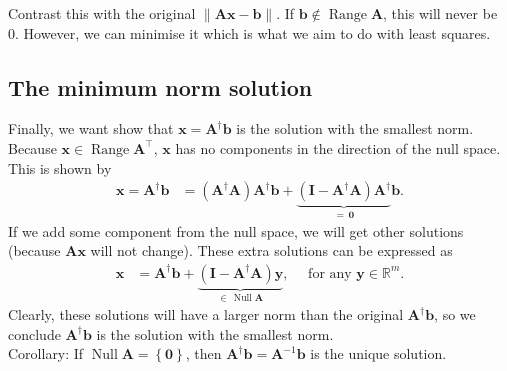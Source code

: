\documentclass[12pt,a4paper]{article} %
\DeclareMathOperator{\Range}{Range}
\DeclareMathOperator{\Null}{Null}
\begin{document}
Contrast this with the original $\| \mathbf A \bm x - \bm b \|$. If $\bm b \notin \Range \mathbf A$, this will never be 0.
However, we can minimise it which is what we aim to do with least squares. 

\subsection{The minimum norm solution}

Finally, we want show that $\bm x = \mathbf A^\dagger \bm b$ 
is the solution with the smallest norm. Because $\bm x \in \Range \mathbf A^\top$, 
$\bm x$ has no components in the direction of  the null space. This is shown by 
\begin{align*}
    \bm x=\mathbf A^\dagger \bm b &= (\mathbf A^\dagger \mathbf A)\mathbf A^\dagger\bm b + \underbrace{(\mathbf I - \mathbf A^\dagger \mathbf A)\mathbf A^\dagger}_{=\,\bm 0}\bm b.
\end{align*}
If we add some component from the null space, we will get other solutions (because $\mathbf A \bm x$ will not change). 
These extra solutions can be expressed as
\begin{align*}
    \bm x &= \mathbf A^\dagger\bm b + \underbrace{(\mathbf I - \mathbf A^\dagger \mathbf A)\bm y}_{\in \,\Null \mathbf A}, \quad \text{ for any }\bm y \in \mathbb R^m.
\end{align*}
Clearly, these solutions will have a larger norm than the original $\mathbf A^\dagger \bm b$, so we conclude 
$\mathbf A^\dagger \bm b$  is the solution with the smallest norm. \\[1em]
Corollary: If $\Null \mathbf A = \left\{ \bm 0\right\}$, then $\mathbf A^\dagger \bm b = \mathbf A^{-1} \bm b$ is the unique solution.
\end{document}
